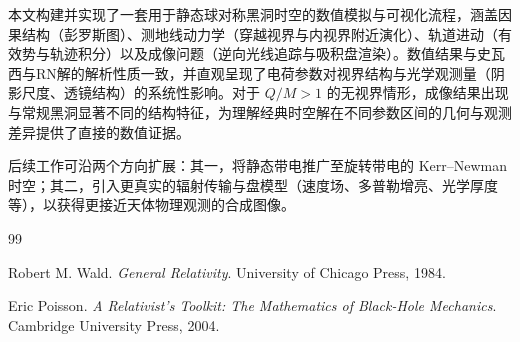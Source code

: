 \documentclass[a4paper,12pt]{article}
\begin{document}
本文构建并实现了一套用于静态球对称黑洞时空的数值模拟与可视化流程，涵盖因果结构（彭罗斯图）、测地线动力学（穿越视界与内视界附近演化）、轨道进动（有效势与轨迹积分）以及成像问题（逆向光线追踪与吸积盘渲染）。数值结果与史瓦西与RN解的解析性质一致，并直观呈现了电荷参数对视界结构与光学观测量（阴影尺度、透镜结构）的系统性影响。对于 $Q/M>1$ 的无视界情形，成像结果出现与常规黑洞显著不同的结构特征，为理解经典时空解在不同参数区间的几何与观测差异提供了直接的数值证据。

后续工作可沿两个方向扩展：其一，将静态带电推广至旋转带电的 Kerr--Newman 时空；其二，引入更真实的辐射传输与盘模型（速度场、多普勒增亮、光学厚度等），以获得更接近天体物理观测的合成图像。


\begin{thebibliography}{99}

Robert M. Wald.
\textit{General Relativity}.
University of Chicago Press, 1984.

Eric Poisson.
\textit{A Relativist's Toolkit: The Mathematics of Black-Hole Mechanics}.
Cambridge University Press, 2004.

\end{thebibliography}
\end{document}
